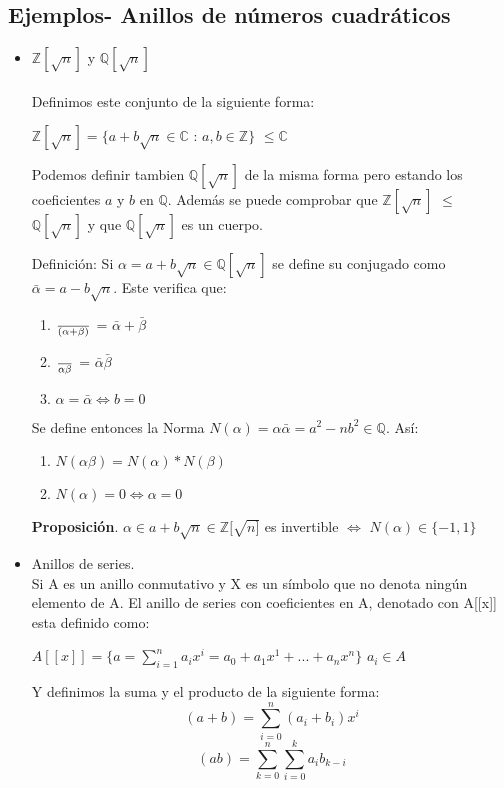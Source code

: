 \documentclass[11pt]{article}
\providecommand{\rac}{\mathbb{Q}}
\providecommand{\ent}{\mathbb{Z}}
\providecommand{\sii}{\Leftrightarrow}
\begin{document}
\subsection{Ejemplos- Anillos de números cuadráticos}

\begin{itemize}
\item $\mathbb{Z}[\sqrt{n}]$ y $\mathbb{Q}[\sqrt{n}]$\\\\
Definimos este conjunto de la siguiente forma:\\
\begin{center}$\mathbb{Z}[\sqrt{n}] = \{a+b\sqrt{n} \in \mathbb{C}$ : $a,b \in \mathbb{Z} \}$ $\leq \mathbb{C}$\end{center}

Podemos definir tambien $\mathbb{Q}[\sqrt{n}]$ de la misma forma pero estando los coeficientes $a$ y $b$ en $\mathbb{Q}$. Además se puede comprobar que $\mathbb{Z}[\sqrt{n}]$ $\leq$ $\mathbb{Q}[\sqrt{n}]$ y que $\mathbb{Q}[\sqrt{n}]$ es un cuerpo.

Definición: Si $\alpha = a+b\sqrt{n}\in \mathbb{Q}[\sqrt{n}]$ se define su conjugado como $\bar{\alpha} = a - b\sqrt{n}$. Este verifica que:
\begin{enumerate}

\item $ \over{(\alpha+ \beta)} $ = $\bar{\alpha} + \bar{\beta}$
\item $\over{\alpha \beta}$ = $\bar{\alpha}\bar{\beta}$
\item $\alpha = \bar{\alpha} \Leftrightarrow b = 0$
	
\end{enumerate} 

Se define entonces la Norma $N(\alpha) = \alpha \bar{\alpha} = a^2 - nb^2 \in \rac $. Así:
\begin{enumerate}
	\item $N(\alpha \beta) = N(\alpha) * N(\beta)$
	\item $N(\alpha) = 0 \sii \alpha = 0$
\end{enumerate}

\textbf{Proposición}.
$\alpha \in a + b \sqrt{n} \in \ent[\sqrt{n]}$ es invertible $\sii$ $N(\alpha) \in \{-1,1\}$

\item Anillos de series.\\
Si A es un anillo conmutativo y X es un símbolo que no denota ningún elemento de A. El anillo de series con coeficientes en A, denotado con A[[x]] esta definido como:\begin{center}
$A[[x]] = \{a = \sum_{i=1}^{n}a_i x^i = a_0 + a_1 x^1 + ... + a_n x^n\}$ $a_i \in A$\end{center}
Y definimos la suma y el producto de la siguiente forma:\\
\[(a+b) = \sum_{i=0}^{n}(a_i+b_i)x^i\]\[ (ab) = \sum_{k=0}^n\sum_{i=0}^{k}a_ib_{k-i}\]
\end{itemize}
\end{document}

